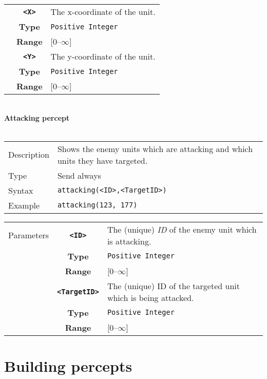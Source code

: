 \begin{tabularx}{\textwidth}{l | c | p{8cm}|}
            \cline{2-3}
            & \textbf{\verb|<X>|} & The x-coordinate of the unit.\\
            & \textbf{Type} & \verb|Positive Integer| \\
            & \textbf{Range} & [0--$\infty$] \\
            \cline{2-3}
            & \textbf{\verb|<Y>|} & The y-coordinate of the unit.\\
            & \textbf{Type} & \verb|Positive Integer| \\
            & \textbf{Range} & [0--$\infty$] \\
            \cline{2-3}
\end{tabularx}\\

\newpage
\noindent
\textbf{Attacking percept}\\
\\
\begin{tabularx}{\textwidth}{lX}
 Description & Shows the enemy units which are attacking and which units they have targeted. \\
 Type & Send always \\
 Syntax & \verb|attacking(<ID>,<TargetID>)| \\
 Example & \verb|attacking(123, 177)| \\
 \end{tabularx}
 \begin{tabularx}{\textwidth}{l | c | p{8cm}|}
 \cline{2-3}
 Parameters & \textbf{\verb|<ID>|} & The (unique) \textit{ID} of the enemy unit which is attacking. \\
            & \textbf{Type} & \verb|Positive Integer| \\
            & \textbf{Range} & [0--$\infty$] \\
            \cline{2-3}
            & \textbf{\verb|<TargetID>|} & The (unique) ID of the targeted unit which is being attacked. \\
            & \textbf{Type} & \verb|Positive Integer| \\
            & \textbf{Range} & [0--$\infty$] \\
            \cline{2-3}
\end{tabularx}

\section{Building percepts}

